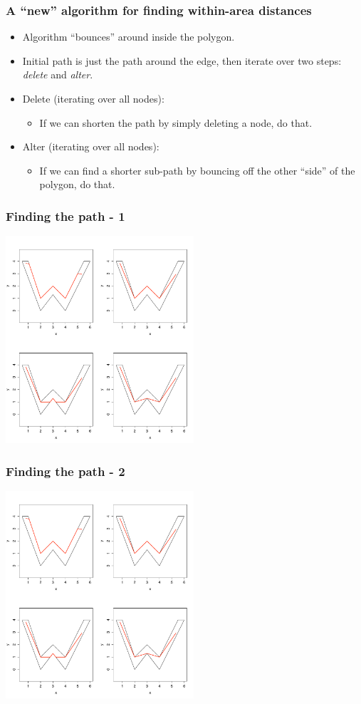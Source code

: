 \documentclass[ignorenonframetext]{beamer} %
\newcommand{\bi}{\begin{itemize}}
\newcommand{\ei}{\end{itemize}}
\begin{document}
\begin{frame}
	\frametitle{A ``new'' algorithm for finding within-area distances}
	\bi
		\item Algorithm ``bounces'' around inside the polygon.
		\item Initial path is just the path around the edge, then iterate over two steps: \textit{delete} and \textit{alter}.
		\item Delete (iterating over all nodes):
			\bi \item If we can shorten the path by simply deleting a node, do that.
			\ei
		\item Alter (iterating over all nodes):
			\bi \item If we can find a shorter sub-path by bouncing off the other ``side'' of the polygon, do that.
			\ei
	\ei
\end{frame}



\begin{frame}
	\frametitle{Finding the path - 1}
            \centering
              \includegraphics[width=2.75in]{figs/wood-2}\\
\end{frame}

\begin{frame}
	\frametitle{Finding the path - 2}
            \centering
              \includegraphics[width=2.75in]{figs/wood-1}\\
\end{frame}
\end{document}
